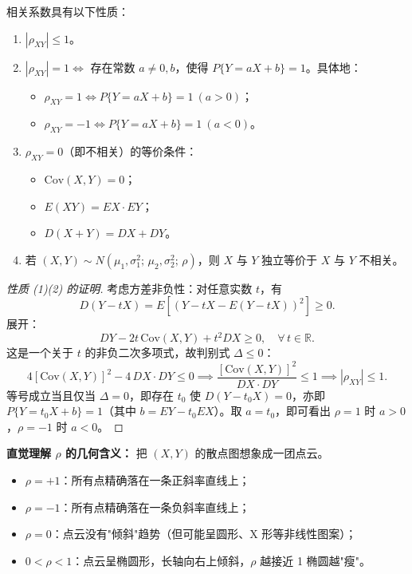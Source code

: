 ﻿\documentclass[lang=cn,11pt]{elegantbook}
\begin{document}
\begin{property}\label{prop:correlation}
相关系数具有以下性质：
\begin{enumerate}
    \item \(|\rho_{XY}| \leqslant 1\)。
    \item \(|\rho_{XY}| = 1 \Leftrightarrow\) 存在常数 \(a \neq 0, b\)，使得 \(P\{Y = aX + b\} = 1\)。具体地：
    \begin{itemize}
        \item \(\rho_{XY} = 1 \Leftrightarrow P\{Y = aX + b\} = 1\ (a > 0)\)；
        \item \(\rho_{XY} = -1 \Leftrightarrow P\{Y = aX + b\} = 1\ (a < 0)\)。
    \end{itemize}
    \item \(\rho_{XY} = 0\)（即不相关）的等价条件：
    \begin{itemize}
        \item \(\mathrm{Cov}(X,Y) = 0\)；
        \item \(E(XY) = EX \cdot EY\)；
        \item \(D(X + Y) = DX + DY\)。
    \end{itemize}
    \item 若 \((X,Y) \sim N(\mu_1, \sigma_1^2;\, \mu_2, \sigma_2^2;\, \rho)\)，则 \(X\) 与 \(Y\) 独立等价于 \(X\) 与 \(Y\) 不相关。
\end{enumerate}
\end{property}
\begin{proof}[性质 (1)(2) 的证明]
考虑方差非负性：对任意实数 \(t\)，有
\[
D(Y - tX) = E[(Y-tX - E(Y-tX))^2] \geqslant 0.
\]
展开：
\[
DY - 2t\,\mathrm{Cov}(X,Y) + t^2 DX \geqslant 0, \quad \forall\, t \in \mathbb{R}.
\]
这是一个关于 \(t\) 的非负二次多项式，故判别式 \(\Delta \leqslant 0\)：
\[
4[\mathrm{Cov}(X,Y)]^2 - 4\,DX\cdot DY \leqslant 0 \implies \frac{[\mathrm{Cov}(X,Y)]^2}{DX \cdot DY} \leqslant 1 \implies |\rho_{XY}| \leqslant 1.
\]
等号成立当且仅当 \(\Delta=0\)，即存在 \(t_0\) 使 \(D(Y - t_0 X)=0\)，亦即 \(P\{Y=t_0 X + b\}=1\)（其中 \(b = EY - t_0 EX\)）。取 \(a=t_0\)，即可看出 \(\rho=1\) 时 \(a>0\)，\(\rho=-1\) 时 \(a<0\)。
\end{proof}

\begin{note}
\textbf{直觉理解 $\rho$ 的几何含义：} 把 $(X,Y)$ 的散点图想象成一团点云。
\begin{itemize}
    \item $\rho=+1$：所有点精确落在一条正斜率直线上；
    \item $\rho=-1$：所有点精确落在一条负斜率直线上；
    \item $\rho=0$：点云没有"倾斜"趋势（但可能呈圆形、X 形等非线性图案）；
    \item $0<\rho<1$：点云呈椭圆形，长轴向右上倾斜，$\rho$ 越接近 1 椭圆越"瘦"。
\end{itemize}
\end{note}
\end{document}
